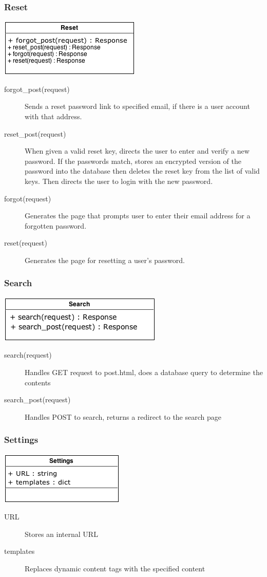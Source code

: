 \documentclass[12pt]{scrartcl}
\begin{document}
\subsubsection{Reset}
\includegraphics[keepaspectratio]{umls/reset_uml.png}
\begin{description}
\item [forgot\_post(request)] Sends a reset password link to specified email, if there is a user account with that address.
\item [reset\_post(request)] When given a valid reset key, directs the user to enter and verify a new password. If the passwords match, stores an encrypted version of the password into the database then deletes the reset key from the list of valid keys. Then directs the user to login with the new password.
\item [forgot(request)] Generates the page that prompts user to enter their email address for a forgotten password.
\item [reset(request)] Generates the page for resetting a user’s password.
\end{description}

\subsubsection{Search}
\includegraphics[keepaspectratio]{umls/search_uml.png}
\begin{description}
\item [search(request)] Handles GET request to post.html, does a database query to determine the contents
\item [search\_post(request)] Handles POST to search, returns a redirect to the search page
\end{description}

\subsubsection{Settings}
\includegraphics[keepaspectratio]{umls/settings_uml.png}
\begin{description}
\item [URL] Stores an internal URL
\item [templates] Replaces dynamic content tags with the specified content
\end{description}
\end{document}
